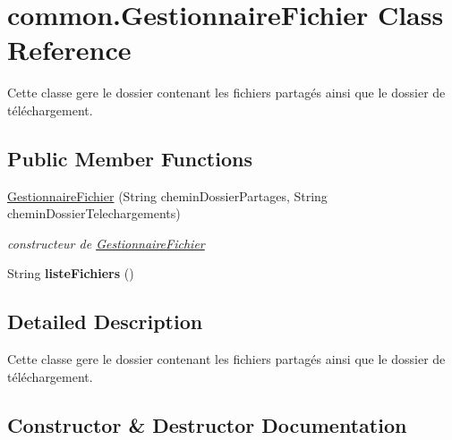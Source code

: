 \hypertarget{classcommon_1_1GestionnaireFichier}{}\section{common.\+Gestionnaire\+Fichier Class Reference}
\label{classcommon_1_1GestionnaireFichier}


Cette classe gere le dossier contenant les fichiers partagés ainsi que le dossier de téléchargement.  


\subsection*{Public Member Functions}
\begin{DoxyCompactItemize}
\item 
\hyperlink{classcommon_1_1GestionnaireFichier_af063deb28fa952a2d0c605bc26659b16}{Gestionnaire\+Fichier} (String chemin\+Dossier\+Partages, String chemin\+Dossier\+Telechargements)
\begin{DoxyCompactList}\small\item\em constructeur de \hyperlink{classcommon_1_1GestionnaireFichier}{Gestionnaire\+Fichier} \end{DoxyCompactList}\item 
\mbox{\label{classcommon_1_1GestionnaireFichier_a7189336732591523f7490df6a16cae34}} 
String {\bfseries liste\+Fichiers} ()
\end{DoxyCompactItemize}


\subsection{Detailed Description}
Cette classe gere le dossier contenant les fichiers partagés ainsi que le dossier de téléchargement. 

\subsection{Constructor \& Destructor Documentation}
\mbox{\label{classcommon_1_1GestionnaireFichier_af063deb28fa952a2d0c605bc26659b16}} 
